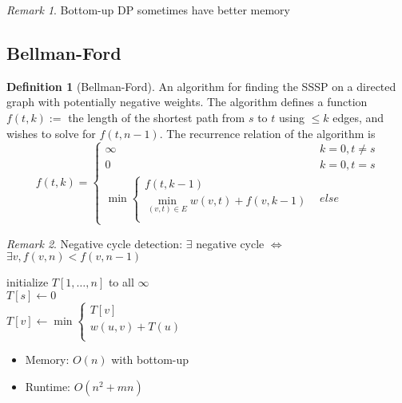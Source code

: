 \documentclass[11pt]{article}
\theoremstyle{definition}
\newtheorem{definition}{Definition}[section]
\theoremstyle{remark}
\newtheorem*{remark}{Remark}
\begin{document}
\begin{remark}
Bottom-up DP sometimes have better memory
\end{remark}

\subsection{Bellman-Ford}

\begin{definition}[Bellman-Ford]
An algorithm for finding the SSSP on a directed graph with potentially negative weights. The algorithm defines a function $f(t,k) :=$ the length of the shortest path from $s$ to $t$ using $\leq k$ edges, and wishes to solve for $f(t,n-1)$. The recurrence relation of the algorithm is
\[
f(t,k) = \begin{cases}
\infty & k=0,t\neq s\\
0 & k=0, t = s \\
\min \begin{cases}
f(t,k-1) \\
\min_{(v,t)\in E} w(v,t)+f(v,k-1) \\
\end{cases} & else
\end{cases}
\]
\end{definition}

\begin{remark}
Negative cycle detection: $\exists$ negative cycle $\Leftrightarrow$ $\exists v, f(v,n)<f(v,n-1)$
\end{remark}

\begin{algorithm}
    \caption{Bellman-Ford}
    
    \DontPrintSemicolon
    
    initialize $T[1,\dots,n]$ to all $\infty$ \\
    $T[s] \gets 0$ \\
     {
    	 {
    		$T[v] \gets \min \begin{cases}
    			T[v]\\
    			w(u,v) + T(u) \\
    		\end{cases}
    		$
    	}
    } 
\end{algorithm}

\begin{itemize}
\item Memory: $O(n)$ with bottom-up
\item Runtime: $O(n^2 +mn)$
\end{itemize}
\end{document}
